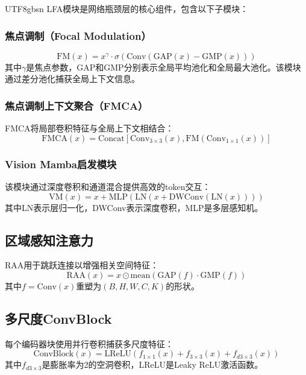 \documentclass[conference]{IEEEtran}
\begin{document}
\begin{CJK}{UTF8}{gbsn}
LFA模块是网络瓶颈层的核心组件，包含以下子模块：

\subsubsection{焦点调制（Focal Modulation）}
\begin{equation}
    \text{FM}(x) = x^{\gamma} \cdot \sigma(\text{Conv}(\text{GAP}(x) - \text{GMP}(x)))
\end{equation}
其中$\gamma$是焦点参数，GAP和GMP分别表示全局平均池化和全局最大池化。该模块通过差分池化捕获全局上下文信息。

\subsubsection{焦点调制上下文聚合（FMCA）}
FMCA将局部卷积特征与全局上下文相结合：
\begin{equation}
    \text{FMCA}(x) = \text{Concat}[\text{Conv}_{3\times3}(x), \text{FM}(\text{Conv}_{1\times1}(x))]
\end{equation}

\subsubsection{Vision Mamba启发模块}
该模块通过深度卷积和通道混合提供高效的token交互：
\begin{equation}
    \text{VM}(x) = x + \text{MLP}(\text{LN}(x + \text{DWConv}(\text{LN}(x))))
\end{equation}
其中LN表示层归一化，DWConv表示深度卷积，MLP是多层感知机。

\subsection{区域感知注意力}

RAA用于跳跃连接以增强相关空间特征：
\begin{equation}
    \text{RAA}(x) = x \odot \text{mean}(\text{GAP}(f) \cdot \text{GMP}(f))
\end{equation}
其中$f = \text{Conv}(x)$重塑为$(B, H, W, C, K)$的形状。

\subsection{多尺度ConvBlock}

每个编码器块使用并行卷积捕获多尺度特征：
\begin{equation}
    \text{ConvBlock}(x) = \text{LReLU}(f_{1\times1}(x) + f_{3\times3}(x) + f_{d3\times3}(x))
\end{equation}
其中$f_{d3\times3}$是膨胀率为2的空洞卷积，LReLU是Leaky ReLU激活函数。


\end{CJK}
\end{document}
